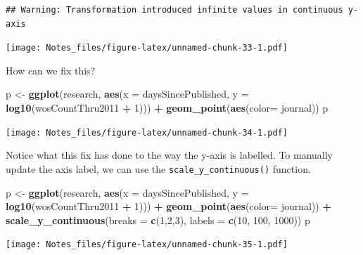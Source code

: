 \documentclass[
]{book}
\newenvironment{Shaded}{\begin{snugshade}}{\end{snugshade}}
\newcommand{\DataTypeTok}[1]{\textcolor[rgb]{0.13,0.29,0.53}{#1}}
\newcommand{\DecValTok}[1]{\textcolor[rgb]{0.00,0.00,0.81}{#1}}
\newcommand{\KeywordTok}[1]{\textcolor[rgb]{0.13,0.29,0.53}{\textbf{#1}}}
\newcommand{\NormalTok}[1]{#1}
\newcommand{\OperatorTok}[1]{\textcolor[rgb]{0.81,0.36,0.00}{\textbf{#1}}}
\newcommand{\StringTok}[1]{\textcolor[rgb]{0.31,0.60,0.02}{#1}}
\begin{document}
\begin{verbatim}
## Warning: Transformation introduced infinite values in continuous y-axis
\end{verbatim}

\texttt{[image: Notes\_files/figure-latex/unnamed-chunk-33-1.pdf]}

How can we fix this?

\begin{Shaded}
\begin{Highlighting}[]
\NormalTok{p <-}\StringTok{ }\KeywordTok{ggplot}\NormalTok{(research, }\KeywordTok{aes}\NormalTok{(}\DataTypeTok{x =}\NormalTok{ daysSincePublished, }
                          \DataTypeTok{y =} \KeywordTok{log10}\NormalTok{(wosCountThru2011 }\OperatorTok{+}\StringTok{ }\DecValTok{1}\NormalTok{))) }\OperatorTok{+}\StringTok{ }
\StringTok{  }\KeywordTok{geom_point}\NormalTok{(}\KeywordTok{aes}\NormalTok{(}\DataTypeTok{color=}\NormalTok{ journal))}
\NormalTok{p}
\end{Highlighting}
\end{Shaded}

\texttt{[image: Notes\_files/figure-latex/unnamed-chunk-34-1.pdf]}

Notice what this fix has done to the way the y-axis is labelled. To manually update the axis label, we can use the \texttt{scale\_y\_continuous()} function.

\begin{Shaded}
\begin{Highlighting}[]
\NormalTok{p <-}\StringTok{ }\KeywordTok{ggplot}\NormalTok{(research, }\KeywordTok{aes}\NormalTok{(}\DataTypeTok{x =}\NormalTok{ daysSincePublished, }
                          \DataTypeTok{y =} \KeywordTok{log10}\NormalTok{(wosCountThru2011 }\OperatorTok{+}\StringTok{ }\DecValTok{1}\NormalTok{))) }\OperatorTok{+}\StringTok{ }
\StringTok{  }\KeywordTok{geom_point}\NormalTok{(}\KeywordTok{aes}\NormalTok{(}\DataTypeTok{color=}\NormalTok{ journal)) }\OperatorTok{+}
\StringTok{  }\KeywordTok{scale_y_continuous}\NormalTok{(}\DataTypeTok{breaks =} \KeywordTok{c}\NormalTok{(}\DecValTok{1}\NormalTok{,}\DecValTok{2}\NormalTok{,}\DecValTok{3}\NormalTok{), }\DataTypeTok{labels =} \KeywordTok{c}\NormalTok{(}\DecValTok{10}\NormalTok{, }\DecValTok{100}\NormalTok{, }\DecValTok{1000}\NormalTok{))}
\NormalTok{p}
\end{Highlighting}
\end{Shaded}

\texttt{[image: Notes\_files/figure-latex/unnamed-chunk-35-1.pdf]}
\end{document}
